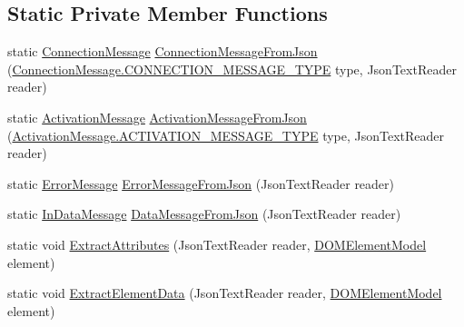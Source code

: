 \subsection*{Static Private Member Functions}
\begin{DoxyCompactItemize}
\item 
static \hyperlink{class_web_analyzer_1_1_models_1_1_message_model_1_1_connection_message}{Connection\+Message} \hyperlink{class_web_analyzer_1_1_models_1_1_message_model_1_1_message_a314276c1b58a764cb8216c85aecbc251}{Connection\+Message\+From\+Json} (\hyperlink{class_web_analyzer_1_1_models_1_1_message_model_1_1_connection_message_a0b8ebc456d3aed9c51235f2a1a1a1cdb}{Connection\+Message.\+C\+O\+N\+N\+E\+C\+T\+I\+O\+N\+\_\+\+M\+E\+S\+S\+A\+G\+E\+\_\+\+T\+Y\+P\+E} type, Json\+Text\+Reader reader)
\item 
static \hyperlink{class_web_analyzer_1_1_models_1_1_message_model_1_1_activation_message}{Activation\+Message} \hyperlink{class_web_analyzer_1_1_models_1_1_message_model_1_1_message_a00da0edc16e3cd335dbc128c04d865de}{Activation\+Message\+From\+Json} (\hyperlink{class_web_analyzer_1_1_models_1_1_message_model_1_1_activation_message_ad3b5847039dd26527a842c6f7675b1b2}{Activation\+Message.\+A\+C\+T\+I\+V\+A\+T\+I\+O\+N\+\_\+\+M\+E\+S\+S\+A\+G\+E\+\_\+\+T\+Y\+P\+E} type, Json\+Text\+Reader reader)
\item 
static \hyperlink{class_web_analyzer_1_1_models_1_1_message_model_1_1_error_message}{Error\+Message} \hyperlink{class_web_analyzer_1_1_models_1_1_message_model_1_1_message_a8a0c7229b12b93ecea85d87799507906}{Error\+Message\+From\+Json} (Json\+Text\+Reader reader)
\item 
static \hyperlink{class_web_analyzer_1_1_models_1_1_message_model_1_1_in_data_message}{In\+Data\+Message} \hyperlink{class_web_analyzer_1_1_models_1_1_message_model_1_1_message_a09f5ab44d912bea7b3ae5e2a78eab490}{Data\+Message\+From\+Json} (Json\+Text\+Reader reader)
\item 
static void \hyperlink{class_web_analyzer_1_1_models_1_1_message_model_1_1_message_a9a2024f67011c88f2d831c4749d8ea06}{Extract\+Attributes} (Json\+Text\+Reader reader, \hyperlink{class_web_analyzer_1_1_models_1_1_data_model_1_1_d_o_m_element_model}{D\+O\+M\+Element\+Model} element)
\item 
static void \hyperlink{class_web_analyzer_1_1_models_1_1_message_model_1_1_message_a8b1248666d8a8c1819b0920f1960f054}{Extract\+Element\+Data} (Json\+Text\+Reader reader, \hyperlink{class_web_analyzer_1_1_models_1_1_data_model_1_1_d_o_m_element_model}{D\+O\+M\+Element\+Model} element)
\end{DoxyCompactItemize}

